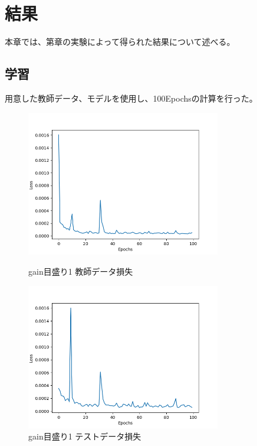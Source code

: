 \documentclass{jreport}		%
\begin{document}
\chapter{結果}
本章では、第章の実験によって得られた結果について述べる。

\section{学習}
用意した教師データ、モデルを使用し、100Epochsの計算を行った。
\begin{figure}[htbp]
 \begin{minipage}{0.5\hsize}
  \begin{center}
   \includegraphics[width=85mm]{gain1_loss.png}
  \end{center}
  \caption{gain目盛り1 教師データ損失}
  \label{fig:one}
 \end{minipage}
 \begin{minipage}{0.5\hsize}
  \begin{center}
   \includegraphics[width=85mm]{gain1_val_loss.png}
  \end{center}
  \caption{gain目盛り1 テストデータ損失}
  \label{fig:two}
 \end{minipage}
\end{figure}
\end{document}
